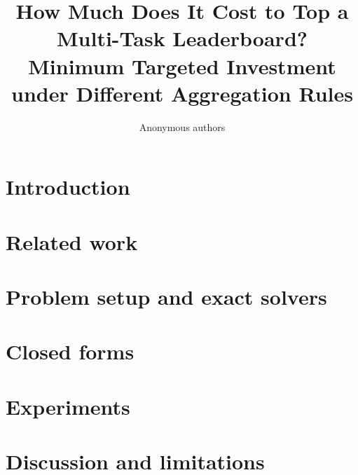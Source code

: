 \documentclass{article}
\title{How Much Does It Cost to Top a Multi-Task Leaderboard? Minimum Targeted Investment under Different Aggregation Rules}
\author{Anonymous authors}
\begin{document}
\maketitle
\begin{abstract}

\end{abstract}

\section{Introduction}\label{sec:intro}


\section{Related work}\label{sec:related}


\section{Problem setup and exact solvers}\label{sec:setup}


\section{Closed forms}\label{sec:theory}


\section{Experiments}\label{sec:experiments}


\section{Discussion and limitations}\label{sec:discussion}





\appendix



\end{document}

